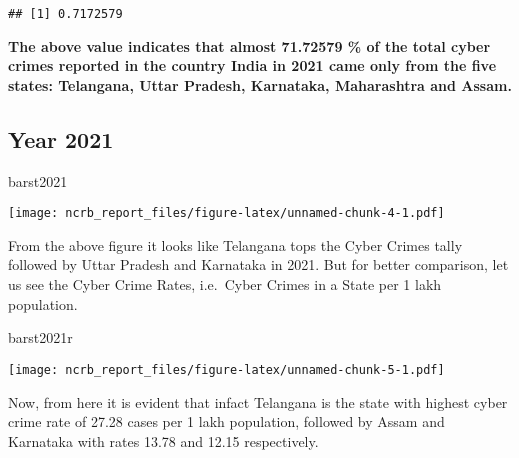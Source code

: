 \documentclass[
  12,
  a4paper,
]{report}
\newenvironment{Shaded}{\begin{snugshade}}{\end{snugshade}}
\newcommand{\DecValTok}[1]{\textcolor[rgb]{0.00,0.00,0.81}{#1}}
\newcommand{\FunctionTok}[1]{\textcolor[rgb]{0.13,0.29,0.53}{\textbf{#1}}}
\newcommand{\NormalTok}[1]{#1}
\newcommand{\OtherTok}[1]{\textcolor[rgb]{0.56,0.35,0.01}{#1}}
\newcommand{\SpecialCharTok}[1]{\textcolor[rgb]{0.81,0.36,0.00}{\textbf{#1}}}
\newcommand{\StringTok}[1]{\textcolor[rgb]{0.31,0.60,0.02}{#1}}
\begin{document}
\begin{verbatim}
## [1] 0.7172579
\end{verbatim}

\textbf{The above value indicates that almost 71.72579 \% of the total
cyber crimes reported in the country India in 2021 came only from the
five states: Telangana, Uttar Pradesh, Karnataka, Maharashtra and
Assam.}

\hypertarget{year-2021}{%
\subsection{Year 2021}\label{year-2021}}

\begin{Shaded}
\begin{Highlighting}[]
\NormalTok{barst2021}
\end{Highlighting}
\end{Shaded}

\texttt{[image: ncrb\_report\_files/figure-latex/unnamed-chunk-4-1.pdf]}

From the above figure it looks like Telangana tops the Cyber Crimes
tally followed by Uttar Pradesh and Karnataka in 2021. But for better
comparison, let us see the Cyber Crime Rates, i.e.~Cyber Crimes in a
State per 1 lakh population.

\begin{Shaded}
\begin{Highlighting}[]
\NormalTok{barst2021r}
\end{Highlighting}
\end{Shaded}

\texttt{[image: ncrb\_report\_files/figure-latex/unnamed-chunk-5-1.pdf]}

Now, from here it is evident that infact Telangana is the state with
highest cyber crime rate of 27.28 cases per 1 lakh population, followed
by Assam and Karnataka with rates 13.78 and 12.15 respectively.

\begin{Shaded}
\end{Shaded}
\end{document}
